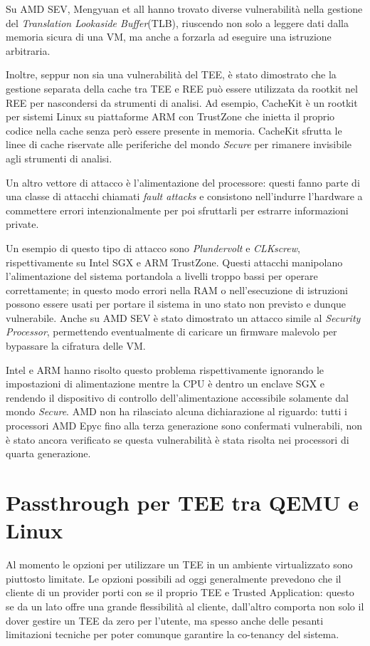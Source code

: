 \documentclass[12pt,italian]{report}
\begin{document}
Su AMD SEV, Mengyuan et all\cite{sev_tlb_poisoning} hanno trovato diverse
vulnerabilità nella gestione del \textit{Translation Lookaside Buffer}(TLB),
riuscendo non solo a leggere dati dalla memoria sicura di una VM, ma anche
a forzarla ad eseguire una istruzione arbitraria.

Inoltre, seppur non sia una vulnerabilità del TEE, è stato
dimostrato che la gestione separata della cache tra TEE e REE
può essere utilizzata da rootkit nel REE per nascondersi da strumenti
di analisi.
Ad esempio, CacheKit\cite{cachekit} è un rootkit per sistemi Linux
su piattaforme ARM con TrustZone che inietta il proprio codice nella
cache senza però essere presente in memoria.
CacheKit sfrutta le linee di cache riservate alle periferiche
del mondo \textit{Secure} per rimanere invisibile agli strumenti
di analisi. 

\bigbreak
Un altro vettore di attacco è l'alimentazione del processore: questi
fanno parte di una classe di attacchi chiamati \textit{fault attacks}
e consistono nell'indurre l'hardware a commettere errori intenzionalmente
per poi sfruttarli per estrarre informazioni private.

Un esempio di questo tipo di attacco sono
\textit{Plundervolt}\cite{plundervolt} e
\textit{CLKscrew}\cite{clkscrew},
rispettivamente su Intel SGX e ARM TrustZone.
Questi attacchi manipolano l'alimentazione del sistema portandola a livelli
troppo bassi per operare correttamente; in questo modo errori nella RAM
o nell'esecuzione di istruzioni possono essere usati per portare il sistema
in uno stato non previsto e dunque vulnerabile.
Anche su AMD SEV è stato dimostrato un attacco simile\cite{sev_power_attack}
al \textit{Security Processor}, permettendo eventualmente di caricare un
firmware malevolo per bypassare la cifratura delle VM.

Intel e ARM hanno risolto questo problema rispettivamente ignorando le
impostazioni di alimentazione mentre la CPU è dentro un enclave SGX e
rendendo il dispositivo di controllo dell'alimentazione accessibile
solamente dal mondo \textit{Secure}.
AMD non ha rilasciato alcuna dichiarazione al riguardo: tutti i processori
AMD Epyc fino alla terza generazione sono confermati vulnerabili, non è
stato ancora verificato se questa vulnerabilità è stata risolta nei
processori di quarta generazione.  

\chapter{Passthrough per TEE tra QEMU e Linux}
\label{chap:passthrough-tee-qemu-linux}
Al momento le opzioni per utilizzare un TEE in un ambiente virtualizzato
sono piuttosto limitate.
Le opzioni possibili ad oggi generalmente prevedono che il cliente di un
provider porti con se il proprio TEE e Trusted Application:
questo se da un lato offre una grande flessibilità al cliente, dall'altro
comporta non solo il dover gestire un TEE da zero per l'utente, ma spesso
anche delle pesanti limitazioni tecniche per poter comunque garantire la
co-tenancy del sistema.
\end{document}
